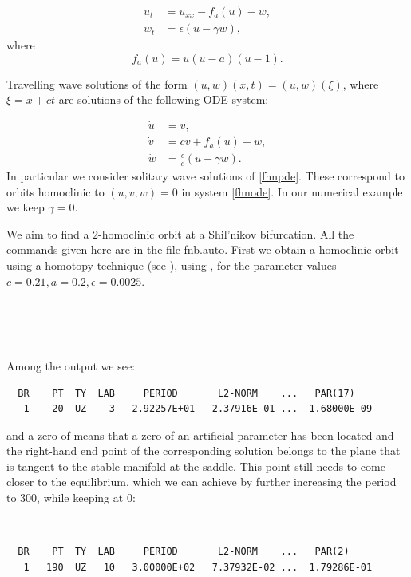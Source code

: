 \documentclass[12pt]{report}
\begin{document}
\begin{equation}
\begin{split}
u_t&=u_{xx}-f_a(u)-w, \\
w_t&=\epsilon(u-\gamma w),
\end{split}
\label{fhnpde}
\end{equation}
where
\[
f_a(u) = u (u-a)(u-1).
\]

Travelling wave solutions of the form $(u,w)(x,t)=(u,w)(\xi)$, where
$\xi=x+ct$ are solutions of the following ODE system:

\begin{equation}
\begin{split}
\dot u &= v,\\
\dot v &= c v + f_a(u) + w,\\
\dot w &= \frac{\epsilon}{c} (u - \gamma w).
\end{split}
\label{fhnode}
\end{equation}
In particular we consider solitary wave solutions of \eqref{fhnpde}.
These correspond to orbits homoclinic to $(u,v,w)=0$ in system \eqref{fhnode}.
In our numerical example we keep $\gamma=0$.

We aim to find a $2$-homoclinic orbit at a Shil'nikov bifurcation.
All the commands given here are in the file fnb.auto.
First we obtain a homoclinic orbit using a homotopy technique (see
), using , for the parameter 
values $c=0.21, a=0.2, \epsilon=0.0025$.

\begin{center}
\\
\\
\\
\end{center}

Among the output we see:
\begin{verbatim}
  BR    PT  TY  LAB     PERIOD       L2-NORM    ...   PAR(17)
   1    20  UZ    3   2.92257E+01   2.37916E-01 ... -1.68000E-09
\end{verbatim}
and a zero of  means that a zero of an artificial parameter has
been located and the right-hand end point of the corresponding
solution belongs to the plane that is tangent to the stable manifold
at the saddle. This point still needs to come closer to the
equilibrium, which we can achieve by further increasing the period to
300, while keeping  at 0:
\begin{center}
\\
\end{center}
\begin{verbatim}
  BR    PT  TY  LAB     PERIOD       L2-NORM    ...   PAR(2)
   1   190  UZ   10   3.00000E+02   7.37932E-02 ...  1.79286E-01
\end{verbatim}
\end{document}
